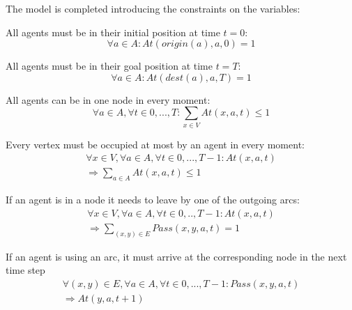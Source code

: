 \documentclass[12pt, a4paper, hidelinks]{article}
\numberwithin{equation}{section}
\begin{document}
The model is completed introducing the constraints on the variables:

\begin{description}\label{equation_set_1}
\item All agents must be in their initial position at time $t = 0$:
\begin{equation}
\forall a \in A: At(origin(a), a, 0) = 1
\label{eq:1.1}\end{equation}

\item All agents must be in their goal position at time $t = T$:
\begin{equation}
\forall a \in A : At(dest(a), a, T) = 1
\label{eq:1.2}\end{equation}

\item All agents can be in one node in every moment:
\begin{equation}
\forall a \in A, \forall t \in {0,...,T}: \displaystyle\sum_{x \in V}At(x,a,t)\leq1
\label{eq:1.3}\end{equation}

\item Every vertex must be occupied at most by an agent in every moment:
\begin{equation}\begin{split}
\forall x \in V, \forall a \in A, \forall t \in {0,...,T-1}: At(x, a, t) \\ 
\Rightarrow \displaystyle\sum_{a \in A}At(x,a,t)\leq1
\end{split}\label{eq:1.4}\end{equation}

\item If an agent is in a node it needs to leave by one of the outgoing arcs:
\begin{equation}\begin{split}
\forall x \in V, \forall a \in A, \forall t \in {0,..,T-1}: At(x,a,t) \\
\Rightarrow  \displaystyle\sum_{(x,y) \in E}Pass(x,y,a,t)=1
\end{split}\label{eq:1.5}\end{equation}

\item If an agent is using an arc, it must arrive at the corresponding node in the next time step
\begin{equation}\begin{split}
\forall (x,y) \in E, \forall a \in A, \forall t \in {0,...,T-1}: Pass(x,y,a,t) \\
\Rightarrow At(y,a,t+1)
\end{split}\label{eq:1.6}
\end{equation}


\end{description}
\end{document}
